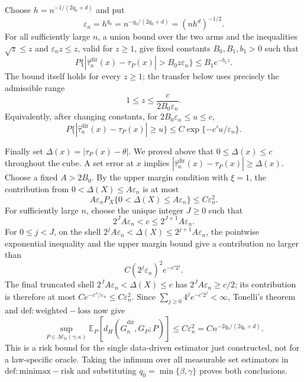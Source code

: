 Choose \(h=n^{-1/(2q_0+d)}\) and put
\[
\varepsilon_n=h^{q_0}=n^{-q_0/(2q_0+d)}=(nh^d)^{-1/2}.
\]
For all sufficiently large \(n\), a union bound over the two arms and the inequalities \(\sqrt z\le z\) and \(\varepsilon_n z\le z\), valid for \(z\ge1\), give fixed constants \(B_0,B_1,b_1>0\) such that
\[
P\{|\widehat\tau_n^{\mathrm{dir}}(x)-\tau_P(x)|>B_0z\varepsilon_n\}
\le B_1e^{-b_1z}.
\]
The bound itself holds for every \(z\ge1\); the transfer below uses precisely the admissible range
\[
1\le z\le\frac{c}{2B_0\varepsilon_n}.
\]
Equivalently, after changing constants, for \(2B_0\varepsilon_n\le u\le c\),
\[
P\{|\widehat\tau_n^{\mathrm{dir}}(x)-\tau_P(x)|\ge u\}
\le C\exp\{-c'u/\varepsilon_n\}.
\]

Finally set \(\Delta(x)=|\tau_P(x)-\theta|\). We proved above that \(0\le\Delta(x)\le c\) throughout the cube. A set error at \(x\) implies \(|\widehat\tau_n^{\mathrm{dir}}(x)-\tau_P(x)|\ge\Delta(x)\). Choose a fixed \(A>2B_0\). By the upper margin condition with \(\xi=1\), the contribution from \(0<\Delta(X)\le A\varepsilon_n\) is at most
\[
A\varepsilon_nP_X\{0<\Delta(X)\le A\varepsilon_n\}
\le C\varepsilon_n^2.
\]
For sufficiently large \(n\), choose the unique integer \(J\ge0\) such that
\[
2^JA\varepsilon_n<c\le2^{J+1}A\varepsilon_n.
\]
For \(0\le j<J\), on the shell \(2^jA\varepsilon_n<\Delta(X)\le2^{j+1}A\varepsilon_n\), the pointwise exponential inequality and the upper margin bound give a contribution no larger than
\[
C(2^j\varepsilon_n)^2e^{-c'2^j}.
\]
The final truncated shell \(2^JA\varepsilon_n<\Delta(X)\le c\) has \(2^JA\varepsilon_n\ge c/2\); its contribution is therefore at most \(C e^{-c''/\varepsilon_n}\le C\varepsilon_n^2\). Since \(\sum_{j\ge0}4^je^{-c'2^j}<\infty\), Tonelli's theorem and \(\mathrm{def:weighted-loss}\) now give
\[
\sup_{P\in\mathcal M_{\mathrm{tr}}(\gamma;\kappa)}
\mathbb E_P[d_H(\widehat G_n^{\mathrm{dir}},G_P;P)]
\le C\varepsilon_n^2
=Cn^{-2q_0/(2q_0+d)}.
\]
This is a risk bound for the single data-driven estimator just constructed, not for a law-specific oracle. Taking the infimum over all measurable set estimators in \(\mathrm{def:minimax-risk}\) and substituting \(q_0=\min\{\beta,\gamma\}\) proves both conclusions.